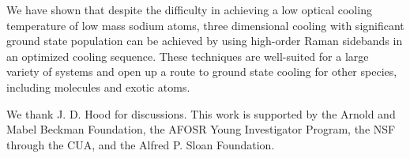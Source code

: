 \documentclass[aps,prl,twocolumn,groupedaddress]{revtex4-1}
\newcommand{\fxnote}[1]{{\textbf{[#1]}}}
\begin{document}

We have shown that despite the difficulty in achieving a low optical cooling temperature
of low mass sodium atoms,  three dimensional cooling
with significant ground state population can be achieved by using high-order Raman sidebands
in an optimized cooling sequence.
These techniques are well-suited for a large variety of systems
and open up a route to ground state cooling for other species, including molecules and exotic atoms.

We thank  J. D. Hood for  discussions.
This work is supported by the Arnold and Mabel Beckman Foundation, the AFOSR Young Investigator Program, the NSF through the CUA,
and the Alfred P. Sloan Foundation.



\end{document}
